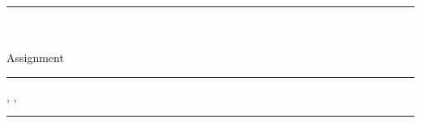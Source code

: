 \documentclass[a4paper,%
11pt,%
DIV=14,
headsepline,%
headings=normal,
]{scrartcl}
\begin{document}
\hrule
\vspace*{2ex}
\begin{center}
{\LARGE\textbf{\fach}}\\
{\large{}%
  \semester \\
  Assignment \excNmbr\\
}
\end{center}
\hrule
\vspace*{1ex}

\noindent
\nname, \vname, \mtrnmbr
\vspace*{1ex}
\hrule

\setlength{\parindent}{0cm}


\end{document}
